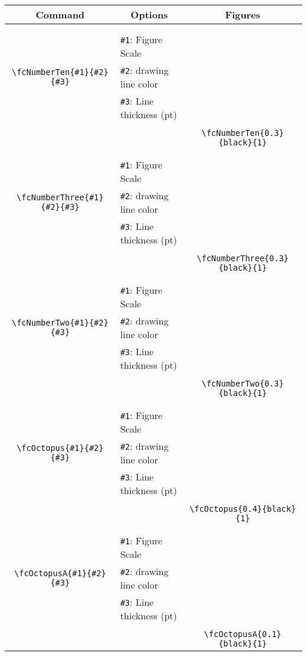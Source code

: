 \documentclass[x11names]{article}
\begin{document}
\begin{table}[H]\centering\begin{tabular}{|c|l|c|}\hline {\bf Command}& \multicolumn{1}{c|}{{\bf Options}} & {\bf Figures}\\  \hline	&&\multirow{5}{*}{\fcNumberTen{0.3}{black}{1}}\\	&&\\	&\verb|#1|: Figure Scale &\\	\verb|\fcNumberTen{#1}{#2}{#3}|&	\verb|#2|: drawing line color &\\	&\verb|#3|: Line thickness (pt) &\\ &&\\&&	\verb|\fcNumberTen{0.3}{black}{1}|\\\hline 	
	&&\multirow{5}{*}{\fcNumberThree{0.3}{black}{1}}\\	&&\\	&\verb|#1|: Figure Scale &\\	\verb|\fcNumberThree{#1}{#2}{#3}|&	\verb|#2|: drawing line color &\\	&\verb|#3|: Line thickness (pt) &\\ &&\\&&	\verb|\fcNumberThree{0.3}{black}{1}|\\\hline 	
	&&\multirow{5}{*}{\fcNumberTwo{0.3}{black}{1}}\\	&&\\	&\verb|#1|: Figure Scale &\\	\verb|\fcNumberTwo{#1}{#2}{#3}|&	\verb|#2|: drawing line color &\\	&\verb|#3|: Line thickness (pt) &\\ &&\\&&	\verb|\fcNumberTwo{0.3}{black}{1}|\\\hline 	
	&&\multirow{5}{*}{\fcOctopus{0.4}{black}{1}}\\	&&\\	&\verb|#1|: Figure Scale &\\	\verb|\fcOctopus{#1}{#2}{#3}|&	\verb|#2|: drawing line color &\\	&\verb|#3|: Line thickness (pt) &\\ &&\\&&	\verb|\fcOctopus{0.4}{black}{1}|\\\hline 	
	&&\multirow{5}{*}{\fcOctopusA{0.1}{black}{1}}\\	&&\\	&\verb|#1|: Figure Scale &\\	\verb|\fcOctopusA{#1}{#2}{#3}|&	\verb|#2|: drawing line color &\\	&\verb|#3|: Line thickness (pt) &\\ &&\\&&	\verb|\fcOctopusA{0.1}{black}{1}|\\\hline 	

\end{tabular}
\end{table}
\end{document}
